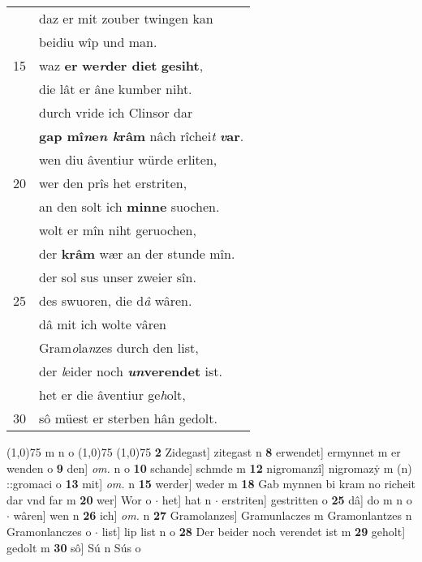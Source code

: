 \documentclass[8pt,a4paper,notitlepage]{article}
\begin{document}
\begin{table}[ht]
\begin{minipage}[t]{0.5\linewidth}
\begin{tabular}{rl}
 & daz er mit zouber twingen kan\\ 
 & beidiu wîp und man.\\ 
15 & waz \textbf{er} \textbf{we\textit{r}der diet} \textbf{gesiht},\\ 
 & die lât er âne kumber niht.\\ 
 & durch vride ich Clinsor dar\\ 
 & \textbf{gap mî\textit{n}e\textit{n k}râm} nâch rîchei\textit{t} \textbf{\textit{v}ar}.\\ 
 & wen diu âventiur würde erliten,\\ 
20 & wer den prîs het erstriten,\\ 
 & an den solt ich \textbf{minne} suochen.\\ 
 & wolt er mîn niht geruochen,\\ 
 & der \textbf{krâm} wær an der stunde mîn.\\ 
 & der sol sus unser zweier sîn.\\ 
25 & des swuoren, die d\textit{â} wâren.\\ 
 & dâ mit ich wolte vâren\\ 
 & Gram\textit{o}la\textit{n}zes durch den list,\\ 
 & der \textit{l}eider noch \textbf{\textit{un}verendet} ist.\\ 
 & het er die âventiur ge\textit{h}olt,\\ 
30 & sô müest er sterben hân gedolt.\\ 
\end{tabular}
\scriptsize
\line(1,0){75} \newline
m n o \newline
\line(1,0){75} \newline
\newline
\line(1,0){75} \newline
\textbf{2} Zidegast] zitegast n \textbf{8} erwendet] ermynnet m er wenden o \textbf{9} den] \textit{om.} n o \textbf{10} schande] schmde m \textbf{12} nigromanzî] nigromazẏ m (n) ::gromaci o \textbf{13} mit] \textit{om.} n \textbf{15} werder] weder m \textbf{18} Gab mynnen bi kram no richeit dar vnd far m \textbf{20} wer] Wor o  $\cdot$ het] hat n  $\cdot$ erstriten] gestritten o \textbf{25} dâ] do m n o  $\cdot$ wâren] wen n \textbf{26} ich] \textit{om.} n \textbf{27} Gramolanzes] Gramunlaczes m Gramonlantzes n Gramonlanczes o  $\cdot$ list] lip list n o \textbf{28} Der beider noch verendet ist m \textbf{29} geholt] gedolt m \textbf{30} sô] Sú n Sús o \newline
\end{minipage}
\end{table}
\end{document}
